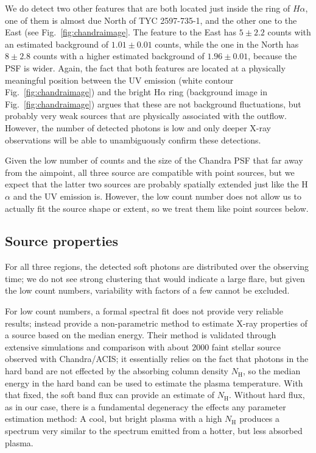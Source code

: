 \documentclass[linenumbers]{aastex631}
\begin{document}
We do detect two other features that are both located just inside the ring of $H\alpha$, one of them is almost due North of TYC 2597-735-1, and the other one to the East (see Fig.~\ref{fig:chandraimage}. The feature to the East has $5\pm2.2$ counts with an estimated background of $1.01\pm0.01$ counts, while the one in the North has $8\pm2.8$ counts with a higher estimated background of $1.96\pm0.01$, because the PSF is wider. Again, the fact that both features are located at a physically meaningful position between the UV emission (white contour Fig.~\ref{fig:chandraimage}) and the bright H$\alpha$ ring (background image in Fig.~\ref{fig:chandraimage}) argues that these are not background fluctuations, but probably very weak sources that are physically associated with the outflow. However, the number of detected photons is low and only deeper X-ray observations will be able to unambiguously confirm these detections.

Given the low number of counts and the size of the Chandra PSF that far away from the aimpoint, all three source are compatible with point sources, but we expect that the latter two sources are probably spatially extended just like the H$\alpha$ and the UV emission is. However, the low count number does not allow us to actually fit the source shape or extent, so we treat them like point sources below. 

\subsection{Source properties}
For all three regions, the detected soft photons are distributed over the observing time; we do not see strong clustering that would indicate a large flare, but given the low count numbers, variability with factors of a few cannot be excluded.

For low count numbers, a formal spectral fit does not provide very reliable results; \citet{2010ApJ...708.1760G} instead provide a non-parametric method to estimate X-ray properties of a source based on the median energy. Their method is validated through extensive simulations and comparison with about 2000 faint stellar source observed with Chandra/ACIS; it essentially relies on the fact that photons in the hard band are not effected by the absorbing column density $N_\mathrm{H}$, so the median energy in the hard band can be used to estimate the plasma temperature. With that fixed, the soft band flux can provide an estimate of $N_\mathrm{H}$. Without hard flux, as in our case, there is a fundamental degeneracy the effects any parameter estimation method: A cool, but bright plasma with a high $N_\mathrm{H}$ produces a spectrum very similar to the spectrum emitted from a hotter, but less absorbed plasma.
\end{document}
